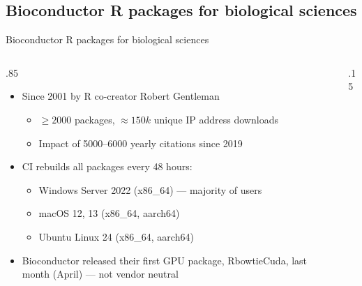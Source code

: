 \documentclass[
aspectratio=169,
xcolor={usenames}
]{beamer}
\begin{document}
\subsection{Bioconductor R packages for biological sciences}
\begin{frame}{Bioconductor R packages for biological sciences}
  \begin{columns}[T]
    \begin{column}{.85\framewidth}
      \begin{itemize}[<+->]
      \item Since 2001 by R co-creator Robert Gentleman
        \begin{itemize}[<.->]
        \item $\ge 2000$ packages, %
          $\approx 150k$ unique IP address downloads\footnotemark[1]
        \item Impact of 5000--6000 yearly citations since 2019\footnotemark[1]
        \end{itemize}
      \item CI rebuilds all packages every 48 hours:
        \begin{itemize}[<.->]
        \item Windows Server 2022 (x86\_64) --- majority of users
        \item macOS 12, 13 (x86\_64, aarch64)
        \item Ubuntu Linux 24 (x86\_64, aarch64)
        \end{itemize}
      \item Bioconductor released their first GPU package, RbowtieCuda, %
        last month (April) --- not vendor neutral
      \end{itemize}
    \end{column}
    \begin{column}{.15\framewidth}
\end{column}
\end{columns}
\end{frame}
\end{document}
